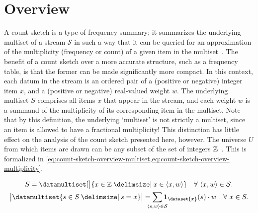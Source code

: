\section{Overview}
\label{sec:count-sketch-overview}

A count sketch is a type of frequency summary; it summarizes the underlying multiset of a stream \( \mathcal{S} \) in such a way that it can be queried for an approximation of the multiplicity (frequency or count) of a given item in the multiset~\citep{charikar02}.
The benefit of a count sketch over a more accurate structure, such as a  frequency table, is that the former can be made significantly more compact.
In this context, each datum in the stream is an ordered pair of a (positive or negative) integer item \( x \), and a (positive or negative) real-valued weight \( w \).
The underlying multiset \( S \) comprises all items \( x \) that appear in the stream, and each weight \( w \) is a summand of the multiplicity of its corresponding item in the multiset.
Note that by this definition, the underlying `multiset' is not strictly a multiset, since an item is allowed to have a fractional multiplicity!
This distinction has little effect on the analysis of the count sketch presented here, however.
The universe \( U \) from which items are drawn can be any subset of the set of integers \( \mathbb{Z} \)~\citep{cormode20}.
This is formalized in \cref{eq:count-sketch-overview-multiset,eq:count-sketch-overview-multiplicity}.

\begin{gather}
  \label{eq:count-sketch-overview-multiset}
  S = \datamultiset[\big]{x \in \integers \suchthat x \in \datasequence{x, w}} \quad \forall\ \datasequence{x, w} \in \mathcal{S}. \\
  \label{eq:count-sketch-overview-multiplicity}
  \cardinality[\big]{\datamultiset{s \in S \suchthat s = x}} = \smashoperator{\sum_{\datasequence{s, w} \in \mathcal{S}}} \indicator_{\dataset{x}} (s) \cdot w \quad \forall\ x \in S.
\end{gather}

